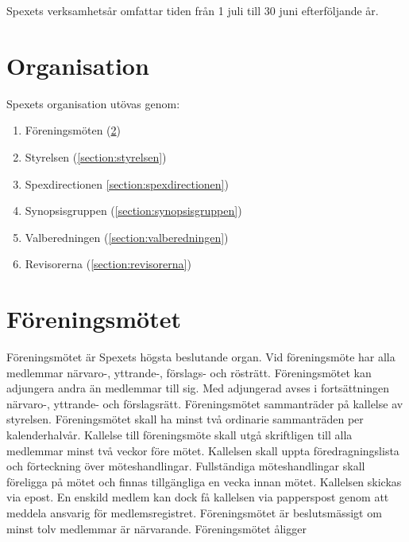\documentclass[a4paper]{article}
\begin{document}
Spexets verksamhetsår omfattar tiden från 1 juli till 30 juni efterföljande år.

\section{Organisation}
Spexets organisation utövas genom:

\begin{enumerate}
  \item Föreningsmöten (\ref{section:föreningsmötet})
  \item Styrelsen (\ref{section:styrelsen})
  \item Spexdirectionen \ref{section:spexdirectionen})
  \item Synopsisgruppen (\ref{section:synopsisgruppen})
  \item Valberedningen (\ref{section:valberedningen})
  \item Revisorerna (\ref{section:revisorerna})
\end{enumerate}

\section{Föreningsmötet}
\label{section:föreningsmötet}
Föreningsmötet är Spexets högsta beslutande organ.\newline
\newline
Vid föreningsmöte har alla medlemmar närvaro-, yttrande-, förslags- och rösträtt. Föreningsmötet kan adjungera andra än medlemmar till sig. Med adjungerad avses i fortsättningen närvaro-, yttrande- och förslagsrätt.\newline
\newline
Föreningsmötet sammanträder på kallelse av styrelsen. Föreningsmötet skall ha minst två ordinarie sammanträden per kalenderhalvår.\newline
\newline
Kallelse till föreningsmöte skall utgå skriftligen till alla medlemmar minst två veckor före mötet. Kallelsen skall uppta föredragningslista och förteckning över möteshandlingar. Fullständiga möteshandlingar skall föreligga på mötet och finnas tillgängliga en vecka innan mötet.\newline
\newline
Kallelsen skickas via epost. En enskild medlem kan dock få kallelsen via papperspost genom att meddela ansvarig för medlemsregistret.\newline
\newline
Föreningsmötet är beslutsmässigt om minst tolv medlemmar är närvarande.\newline
\newline
Föreningsmötet åligger
\end{document}
